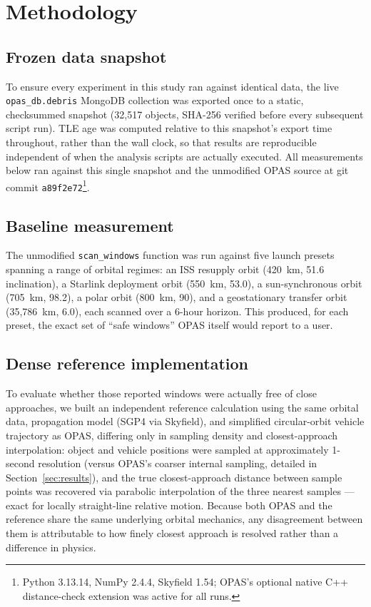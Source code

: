 \documentclass[11pt,a4paper]{article}
\begin{document}
\section{Methodology}
\label{sec:methodology}

\subsection{Frozen data snapshot}

To ensure every experiment in this study ran against identical data, the
live \texttt{opas\_db.debris} MongoDB collection was exported once to a
static, checksummed snapshot (32{,}517 objects, SHA-256 verified before every
subsequent script run). TLE age was computed relative to this snapshot's
export time throughout, rather than the wall clock, so that results are
reproducible independent of when the analysis scripts are actually executed.
All measurements below ran against this single snapshot and the unmodified
OPAS source at git commit \texttt{a89f2e72}\footnote{Python 3.13.14, NumPy
2.4.4, Skyfield 1.54; OPAS's optional native C++ distance-check extension
was active for all runs.}.

\subsection{Baseline measurement}

The unmodified \texttt{scan\_windows} function was run against five launch
presets spanning a range of orbital regimes: an ISS resupply orbit (420~km,
51.6\textdegree{} inclination), a Starlink deployment orbit (550~km,
53.0\textdegree{}), a sun-synchronous orbit (705~km, 98.2\textdegree{}), a
polar orbit (800~km, 90\textdegree{}), and a geostationary transfer orbit
(35{,}786~km, 6.0\textdegree{}), each scanned over a 6-hour horizon. This
produced, for each preset, the exact set of ``safe windows'' OPAS itself would
report to a user.

\subsection{Dense reference implementation}

To evaluate whether those reported windows were actually free of close
approaches, we built an independent reference calculation using the same
orbital data, propagation model (SGP4 via Skyfield), and simplified
circular-orbit vehicle trajectory as OPAS, differing only in sampling
density and closest-approach interpolation: object and vehicle positions were
sampled at approximately 1-second resolution (versus OPAS's coarser internal
sampling, detailed in Section~\ref{sec:results}), and the true closest-approach
distance between sample points was recovered via parabolic interpolation of
the three nearest samples --- exact for locally straight-line relative
motion. Because both OPAS and the reference share the same underlying
orbital mechanics, any disagreement between them is attributable to how
finely closest approach is resolved rather than a difference in physics.
\end{document}
